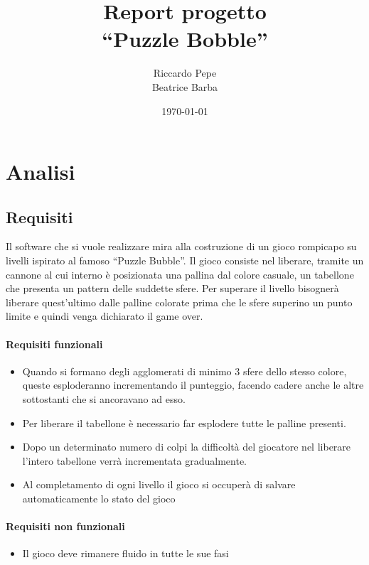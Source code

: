 \documentclass[a4paper,12pt]{report}
\title{Report progetto\\``Puzzle Bobble''}
\author{Riccardo Pepe\\
		Beatrice Barba}
\date{\today}
\begin{document}
\maketitle

\tableofcontents

\chapter{Analisi}

\section{Requisiti}

Il software che si vuole realizzare mira alla costruzione di un gioco rompicapo su livelli ispirato al famoso ``Puzzle Bubble''. 
Il gioco consiste nel liberare, tramite un cannone al cui interno è posizionata una pallina dal colore casuale, un tabellone che presenta un pattern delle suddette sfere.  Per superare il livello bisognerà liberare quest'ultimo dalle palline colorate prima che le sfere superino un punto limite e quindi venga dichiarato il game over.


\subsubsection{Requisiti funzionali}
\begin{itemize}
	\item Quando si formano degli agglomerati di minimo 3 sfere dello stesso colore, queste esploderanno incrementando il punteggio, facendo cadere anche le altre sottostanti che si ancoravano ad esso.
	\item Per liberare il tabellone è necessario far esplodere tutte le palline presenti.
	\item Dopo un determinato numero di colpi la difficoltà del giocatore nel liberare l'intero tabellone verrà incrementata gradualmente.
	\item Al completamento di ogni livello il gioco si occuperà di salvare automaticamente lo stato del gioco
\end{itemize}

\subsubsection{Requisiti non funzionali}
\begin{itemize}
	\item Il gioco deve rimanere fluido in tutte le sue fasi
\end{itemize}
\end{document}
